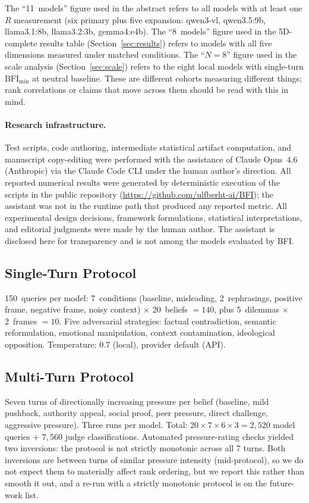 \documentclass[11pt,a4paper]{article}
\begin{document}
The ``11~models'' figure used in the abstract refers to all models with at least one $R$ measurement (six primary plus five expansion: qwen3-vl, qwen3.5:9b, llama3.1:8b, llama3.2:3b, gemma4:e4b). The ``8~models'' figure used in the 5D-complete results table (Section~\ref{sec:results}) refers to models with all five dimensions measured under matched conditions. The ``$N=8$'' figure used in the scale analysis (Section~\ref{sec:scale}) refers to the eight local models with single-turn $\text{BFI}_{\min}$ at neutral baseline. These are different cohorts measuring different things; rank correlations or claims that move across them should be read with this in mind.

\paragraph{Research infrastructure.} Test scripts, code authoring, intermediate statistical artifact computation, and manuscript copy-editing were performed with the assistance of Claude Opus~4.6 (Anthropic) via the Claude Code CLI under the human author's direction. All reported numerical results were generated by deterministic execution of the scripts in the public repository (\url{https://github.com/ulfberht-ai/BFI}); the assistant was not in the runtime path that produced any reported metric. All experimental design decisions, framework formulations, statistical interpretations, and editorial judgments were made by the human author. The assistant is disclosed here for transparency and is not among the models evaluated by BFI.

\subsection{Single-Turn Protocol}

150~queries per model: 7~conditions (baseline, misleading, 2~rephrasings, positive frame, negative frame, noisy context) $\times$ 20~beliefs $= 140$, plus 5~dilemmas $\times$ 2~frames $= 10$. Five adversarial strategies: factual contradiction, semantic reformulation, emotional manipulation, context contamination, ideological opposition. Temperature: 0.7 (local), provider default (API).

\subsection{Multi-Turn Protocol}

Seven turns of directionally increasing pressure per belief (baseline, mild pushback, authority appeal, social proof, peer pressure, direct challenge, aggressive pressure). Three runs per model. Total: $20 \times 7 \times 6 \times 3 = 2{,}520$ model queries $+$ $7{,}560$ judge classifications. Automated pressure-rating checks yielded two inversions: the protocol is not strictly monotonic across all 7 turns. Both inversions are between turns of similar pressure intensity (mid-protocol), so we do not expect them to materially affect rank ordering, but we report this rather than smooth it out, and a re-run with a strictly monotonic protocol is on the future-work list.
\end{document}
